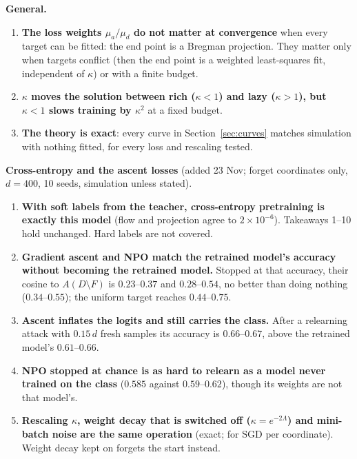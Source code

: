 \documentclass[10pt]{article}
\begin{document}
\textbf{General.}
\begin{enumerate}\setlength{\itemsep}{1pt}\setcounter{enumi}{7}
\item \textbf{The loss weights $\mu_a/\mu_d$ do not matter at convergence} when every target can be fitted: the end point is a Bregman projection. They matter only when targets conflict (then the end point is a weighted least-squares fit, independent of $\kappa$) or with a finite budget.
\item \textbf{$\kappa$ moves the solution between rich ($\kappa<1$) and lazy ($\kappa>1$), but $\kappa<1$ slows training by $\kappa^2$} at a fixed budget.
\item \textbf{The theory is exact}: every curve in Section~\ref{sec:curves} matches simulation with nothing fitted, for every loss and rescaling tested.
\end{enumerate}

\textbf{Cross-entropy and the ascent losses} (added 23 Nov; forget coordinates only, $d=400$, 10 seeds, simulation unless stated).
\begin{enumerate}\setlength{\itemsep}{1pt}\setcounter{enumi}{10}
\item \textbf{With soft labels from the teacher, cross-entropy pretraining is exactly this model} (flow and projection agree to $2\times10^{-6}$). Takeaways 1--10 hold unchanged. Hard labels are not covered.
\item \textbf{Gradient ascent and NPO match the retrained model's accuracy without becoming the retrained model.} Stopped at that accuracy, their cosine to $A(D\setminus F)$ is $0.23$--$0.37$ and $0.28$--$0.54$, no better than doing nothing ($0.34$--$0.55$); the uniform target reaches $0.44$--$0.75$.
\item \textbf{Ascent inflates the logits and still carries the class.} After a relearning attack with $0.15\,d$ fresh samples its accuracy is $0.66$--$0.67$, above the retrained model's $0.61$--$0.66$.
\item \textbf{NPO stopped at chance is as hard to relearn as a model never trained on the class} ($0.585$ against $0.59$--$0.62$), though its weights are not that model's.
\item \textbf{Rescaling $\kappa$, weight decay that is switched off ($\kappa=e^{-2\Lambda}$) and mini-batch noise are the same operation} (exact; for SGD per coordinate). Weight decay kept on forgets the start instead.
\end{enumerate}
\end{document}
